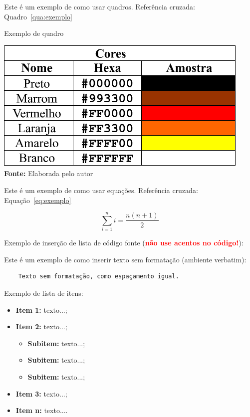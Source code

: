 \documentclass[
	article,			%
	11pt,				%
	oneside,			%
	a4paper,			%
	chapter=TITLE,		%
	section=TITLE,		%
	english,			%
	brazil,				%
	sumario=tradicional
]{abntex2}
\begin{document}
	
	Este é um exemplo de como usar quadros. Referência cruzada: Quadro~\ref{qua:exemplo}
	
	\FloatBarrier
	\begin{quadro}[!htbp]
		\centering
		\caption{Exemplo de quadro}
		\includegraphics[scale=.7]{imagens/exemploQuadro}
		\\\textbf{Fonte:} Elaborada pelo autor
		\label{qua:exemplo}
	\end{quadro}
	\FloatBarrier
	
	
	Este é um exemplo de como usar equações. Referência cruzada: Equação~\ref{eq:exemplo}
	
	\begin{equation}
	\sum_{i=1}^{n} i = \frac{n(n+1)}{2}
	\label{eq:exemplo}
	\end{equation}
	
	
	Exemplo de inserção de lista de código fonte (\textbf{\textcolor{red}{não use acentos no código!}}):
	
	 
	
	
	
	Este é um exemplo de como inserir texto sem formatação (ambiente verbatim):
	
	\begin{verbatim}
	Texto sem formatação, como espaçamento igual.
	\end{verbatim}
	
	
	Exemplo de lista de itens:
	
	\begin{itemize}
		\item \textbf{Item 1:} texto...;
		\item \textbf{Item 2:} texto...;
        \begin{itemize}
                \item \textbf{Subitem:} texto...;
                \item \textbf{Subitem:} texto...;
                \item \textbf{Subitem:} texto...;
            \end{itemize}
		\item \textbf{Item 3:} texto...;
		\item \textbf{Item n:} texto....
	\end{itemize}
	
\end{document}

